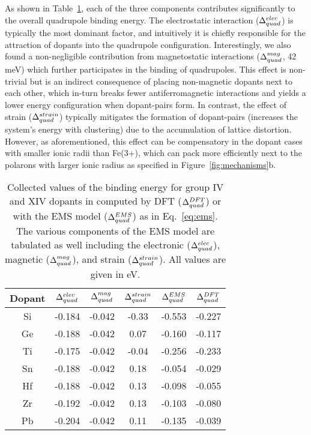 As shown in Table~\ref{table:ems}, each of the three components contributes significantly to the overall quadrupole binding energy. The electrostatic interaction ($\Delta_{quad}^{elec}$) is typically the most dominant factor, and intuitively it is chiefly responsible for the attraction of dopants into the quadrupole configuration.
Interestingly, we also found a non-negligible contribution from magnetostatic interactions ($\Delta_{quad}^{mag}$, 42 meV) which further participates in the binding of quadrupoles.
This effect is non-trivial but is an indirect consequence of placing non-magnetic dopants next to each other, which in-turn breaks fewer antiferromagnetic interactions and yields a lower energy configuration when dopant-pairs form. %
In contrast, the effect of strain ($\Delta_{quad}^{strain}$) typically mitigates the formation of dopant-pairs %
(increases the system's energy with clustering) due to the accumulation of lattice distortion. However, as aforementioned, this effect can be compensatory in the dopant cases with smaller ionic radii than Fe(3+), which can pack more efficiently next to the polarons with larger ionic radius as specified in Figure~\ref{fig:mechanisms}b.

\begin{table}[H]
    \footnotesize
    \centering
    \begin{tabular}{c|ccc|c|c}
    \hline \hline
    Dopant & $\Delta_{quad}^{elec}$ & $\Delta_{quad}^{mag}$ & $\Delta_{quad}^{strain}$ & $\Delta_{quad}^{EMS}$ & $\Delta_{quad}^{DFT}$ \\
    \hline
    Si & -0.184 & -0.042 & -0.33 & -0.553 & -0.227 \\
    Ge & -0.188 & -0.042 &  0.07 & -0.160 & -0.117 \\
    Ti & -0.175 & -0.042 & -0.04 & -0.256 & -0.233 \\
    Sn & -0.188 & -0.042 &  0.18 & -0.054 & -0.029 \\
    Hf & -0.188 & -0.042 &  0.13 & -0.098 & -0.055 \\
    Zr & -0.192 & -0.042 &  0.13 & -0.103 & -0.080 \\
    Pb & -0.204 & -0.042 &  0.11 & -0.135 & -0.039 \\
    \hline \hline
    \end{tabular}
    \caption{Collected values of the binding energy for group IV and XIV dopants in  computed by DFT ($\Delta_{quad}^{DFT}$) or with the EMS model ($\Delta_{quad}^{EMS}$) as in Eq.~\ref{eq:ems}. The various components of the EMS model are tabulated as well including the electronic ($\Delta_{quad}^{elec}$), magnetic ($\Delta_{quad}^{mag}$), and strain ($\Delta_{quad}^{strain}$). All values are given in eV.}
    \label{table:ems}
\end{table}


